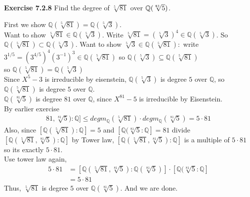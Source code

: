 \documentclass{article}
\begin{document}
\begin{homeworkProblem}
    \textbf{Exercise 7.2.8} Find the degree of $\sqrt[5]{81}$ over $\mathbb{Q}(\sqrt[81]{5})$.

    \solution

    First we show $\mathbb{Q}(\sqrt[5]{81}) = \mathbb{Q}(\sqrt[5]{3})$.\\
    Want to show $\sqrt[5]{81} \in \mathbb{Q}(\sqrt[5]{3})$. 
    Write $\sqrt[5]{81} = (\sqrt[5]{3})^4 \in \mathbb{Q}(\sqrt[5]{3})$.
    So $\mathbb{Q}(\sqrt[5]{81}) \subset \mathbb{Q}(\sqrt[5]{3})$.
    Want to show $\sqrt[5]{3} \in \mathbb{Q}(\sqrt[5]{81}):$
    write $3^{1/5} = \left( 3^{4/5} \right)^4 (3^{-1})^3 \in \mathbb{Q} \left( \sqrt[5]{81} \right)$
    so $\mathbb{Q}(\sqrt[5]{3}) \subseteq \mathbb{Q}(\sqrt[5]{81})$\\
    so $\mathbb{Q}(\sqrt[5]{81}) = \mathbb{Q}(\sqrt[5]{3})$\\
    Since $X^5 - 3$ is irreducible by eisenstein, 
    $\mathbb{Q}(\sqrt[5]{3})$ is degree $5$ over $\mathbb{Q}$,
    so $\mathbb{Q}(\sqrt[5]{81})$ is degree $5$ over $\mathbb{Q}$.\\
    $\mathbb{Q}(\sqrt[81]{5})$ is degree $81$ over $\mathbb{Q}$,
    since $X^{81} - 5$ is irreducible by Eisenstein.\\
    By earlier exercise
    \begin{align}
        [\mathbb{Q}(\sqrt[5]{81}, \sqrt[81]{5}) : \mathbb{Q}] 
        \leq deg m_{\mathbb{Q}}(\sqrt[5]{81}) \cdot deg m_{\mathbb{Q}}(\sqrt[81]{5}) = 5 \cdot 81
    \end{align}
    Also, since $[\mathbb{Q}(\sqrt[5]{81}):\mathbb{Q}] = 5$ and
    $[\mathbb{Q}(\sqrt[81]{5}: \mathbb{Q}] = 81$ divide
    $[\mathbb{Q}(\sqrt[5]{81}, \sqrt[81]{5}) : \mathbb{Q}]$
    by Tower law, $[\mathbb{Q}(\sqrt[5]{81}, \sqrt[81]{5}): \mathbb{Q}]$
    is a multiple of $5 \cdot 81$ so its exactly $5 \cdot 81$.\\
    Use tower law again,
    \begin{align}
        5 \cdot 81 &= [\mathbb{Q}(\sqrt[5]{81},\sqrt[81]{5}): \mathbb{Q}(\sqrt[81]{5})]
        \cdot \left[ \mathbb{Q}(\sqrt[81]{5} : \mathbb{Q} \right]\\
        &= 5 \cdot 81
    \end{align}
    Thus, $\sqrt[5]{81}$ is degree $5$ over $\mathbb{Q}(\sqrt[81]{5})$. 
    And we are done.
    
    


    



\end{homeworkProblem}
\end{document}
